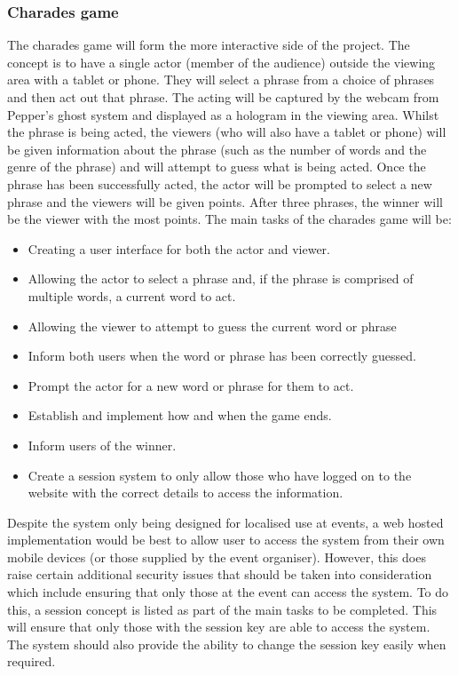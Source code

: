 \subsubsection{Charades game}
The charades game will form the more interactive side of the project. The concept is to have a single actor (member of the audience) outside the viewing area with a tablet or phone. They will select a phrase from a choice of phrases and then act out that phrase. The acting will be captured by the webcam from Pepper's ghost system and displayed as a hologram in the viewing area. Whilst the phrase is being acted, the viewers (who will also have a tablet or phone) will be given information about the phrase (such as the number of words and the genre of the phrase) and will attempt to guess what is being acted. Once the phrase has been successfully acted, the actor will be prompted to select a new phrase and the viewers will be given points. After three phrases, the winner will be the viewer with the most points. The main tasks of the charades game will be:
\begin{itemize}
	\item Creating a user interface for both the actor and viewer.
	\item Allowing the actor to select a phrase and, if the phrase is comprised of multiple words, a current word to act.
	\item Allowing the viewer to attempt to guess the current word or phrase
	\item Inform both users when the word or phrase has been correctly guessed.
	\item Prompt the actor for a new word or phrase for them to act.
	\item Establish and implement how and when the game ends.
	\item Inform users of the winner.	
	\item Create a session system to only allow those who have logged on to the website with the correct details to access the information. 
\end{itemize}

Despite the system only being designed for localised use at events, a web hosted implementation would be best to allow user to access the system from their own mobile devices (or those supplied by the event organiser). However, this does raise certain additional security issues that should be taken into consideration which include ensuring that only those at the event can access the system. To do this, a session concept is listed as part of the main tasks to be completed. This will ensure that only those with the session key are able to access the system. The system should also provide the ability to change the session key easily when required.

